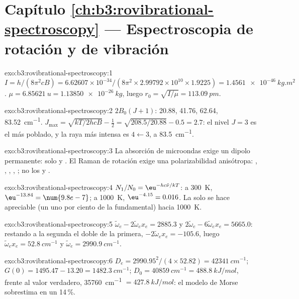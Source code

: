 \section*{Capítulo \ref{ch:b3:rovibrational-spectroscopy} --- Espectroscopia de rotación y de vibración}

\begin{solution}{exo:b3:rovibrational-spectroscopy:1}
$I = h/(8\pi^2cB) = 6.62607 \times 10^{-34}/(8\pi^2 \times 2.99792 \times 10^{10} \times
1.9225) = \qty{1.4561e-46}{kg.m^2}$. $\mu = \qty{6.85621}{u} = \qty{1.13850e-26}{kg}$, luego
$r_0 = \sqrt{I/\mu} = \qty{113.09}{pm}$.
\end{solution}

\begin{solution}{exo:b3:rovibrational-spectroscopy:2}
$2B_0(J+1)$: 20.88, 41.76, 62.64, \qty{83.52}{cm^{-1}}. $J_{\max} = \sqrt{kT/2hcB} -
\frac12 = \sqrt{208.5/20.88} - 0.5 = 2.7$: el nivel $J = 3$ es el más
poblado, y la raya más intensa es $4 \leftarrow 3$, a \qty{83.5}{cm^{-1}}.
\end{solution}

\begin{solution}{exo:b3:rovibrational-spectroscopy:3}
La absorción de microondas exige un dipolo permanente: solo  y .
El Raman de rotación exige una polarizabilidad anisótropa: , , ,
, ; no los   y .
\end{solution}

\begin{solution}{exo:b3:rovibrational-spectroscopy:4}
$N_1/N_0 = \eu^{-hc\tilde\nu/kT}$: a \qty{300}{K}, $\eu^{-13.84} = \num{9.8e-7}$; a
\qty{1000}{K}, $\eu^{-4.15} = 0.016$. La  solo se hace apreciable (un uno por ciento de
la fundamental) hacia \qty{1000}{K}.
\end{solution}

\begin{solution}{exo:b3:rovibrational-spectroscopy:5}
$\tilde\omega_e - 2\tilde\omega_ex_e = 2885.3$ y $2\tilde\omega_e - 6\tilde\omega_ex_e =
5665.0$: restando a la segunda el doble de la primera, $-2\tilde\omega_ex_e = -105.6$,
luego $\tilde\omega_ex_e = \qty{52.8}{cm^{-1}}$ y $\tilde\omega_e = \qty{2990.9}{cm^{-1}}$.
\end{solution}

\begin{solution}{exo:b3:rovibrational-spectroscopy:6}
$D_e = 2990.95^2/(4 \times 52.82) = \qty{42341}{cm^{-1}}$; $G(0) = 1495.47 - 13.20 =
\qty{1482.3}{cm^{-1}}$; $D_0 = \qty{40859}{cm^{-1}} = \qty{488.8}{kJ/mol}$, frente al valor verdadero,
\qty{35760}{cm^{-1}} $= \qty{427.8}{kJ/mol}$: el modelo de Morse sobrestima en un 14\,\%.
\end{solution}

